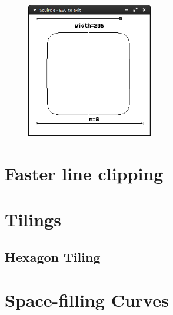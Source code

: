 \documentclass[12pt,openany,a4,usenames,dvipsnames]{book}
\begin{document}
\begin{figure}[H]
  \centering
  \includegraphics[width=0.49\textwidth,keepaspectratio]{figures/squircle_8.png}\par
\end{figure}
%
%
%
%
%
%
%
%
\chapter{Faster line clipping}
\skelpar%
\chapter{Tilings}
\section{Hexagon Tiling}
\chapter{Space-filling Curves}
\skelpar%
\clearpage{}
\end{document}
